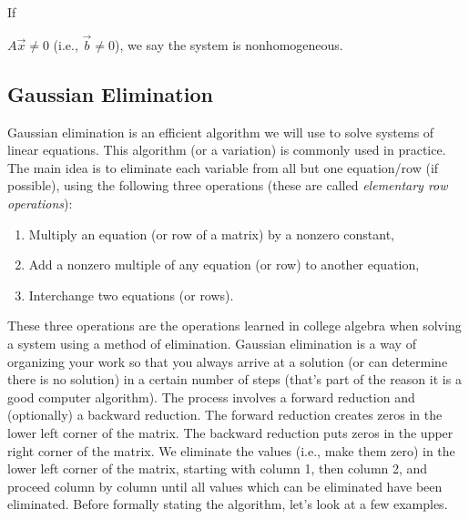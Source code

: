 If {$A\vec x\neq 0$ (i.e., $\vec b \neq 0$), we say the system is nonhomogeneous.

\subsection{Gaussian Elimination}

Gaussian elimination is an efficient algorithm we will use to solve
systems of linear equations. This algorithm (or a variation) is commonly used
in practice.  The main idea is to eliminate each variable from all but
one equation/row (if possible), using the following three operations
(these are called \textit{elementary row operations}):
\begin{enumerate}
  \item Multiply an equation (or row of a matrix) by a nonzero constant,
  \item Add a nonzero multiple of any equation (or row) to another equation,
  \item Interchange two equations (or rows).
\end{enumerate}
These three operations are the operations learned in college algebra
when solving a system using a method of elimination.  Gaussian
elimination is a way of organizing your work so that you always arrive
at a solution (or can determine there is no solution) in a certain
number of steps (that's part of the reason it is a good computer
algorithm). The process involves a forward reduction and (optionally)
a backward reduction. The forward reduction creates zeros in the lower
left corner of the matrix.  The backward reduction puts zeros in the
upper right corner of the matrix. We eliminate the values (i.e., make
them zero) in the lower left corner of the matrix, starting with
column 1, then column 2, and proceed column by column until all
values which can be eliminated have been
eliminated. Before formally stating the algorithm, let's look at a few
examples.

}
